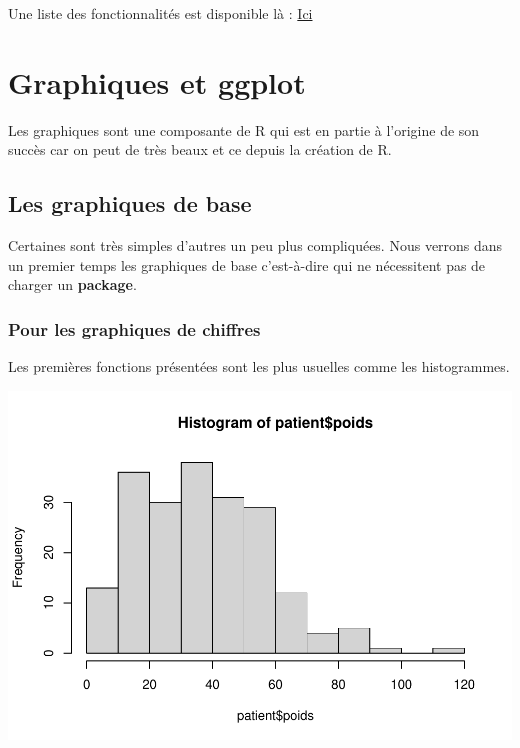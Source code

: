 \documentclass[
]{book}
\newenvironment{Shaded}{\begin{snugshade}}{\end{snugshade}}
\newcommand{\FunctionTok}[1]{\textcolor[rgb]{0.13,0.29,0.53}{\textbf{#1}}}
\newcommand{\NormalTok}[1]{#1}
\newcommand{\SpecialCharTok}[1]{\textcolor[rgb]{0.81,0.36,0.00}{\textbf{#1}}}
\begin{document}
Une liste des fonctionnalités est disponible là :
\href{https://www.danieldsjoberg.com/gtsummary/reference/theme_gtsummary.html\#examples}{Ici}

\hypertarget{graphiques-et-ggplot}{%
\chapter{Graphiques et ggplot}\label{graphiques-et-ggplot}}

Les graphiques sont une composante de R qui est en partie à l'origine de son
succès car on peut de très beaux et ce depuis la création de R.

\hypertarget{les-graphiques-de-base}{%
\section{Les graphiques de base}\label{les-graphiques-de-base}}

Certaines sont très simples d'autres un peu plus compliquées. Nous verrons dans
un premier temps les graphiques de base c'est-à-dire qui ne nécessitent pas de
charger un \textbf{package}.

\hypertarget{pour-les-graphiques-de-chiffres}{%
\subsection{Pour les graphiques de chiffres}\label{pour-les-graphiques-de-chiffres}}

Les premières fonctions présentées sont les plus usuelles comme les histogrammes.

\begin{Shaded}
\end{Shaded}

\includegraphics{_main_files/figure-latex/poids1-1.pdf}
\end{document}
